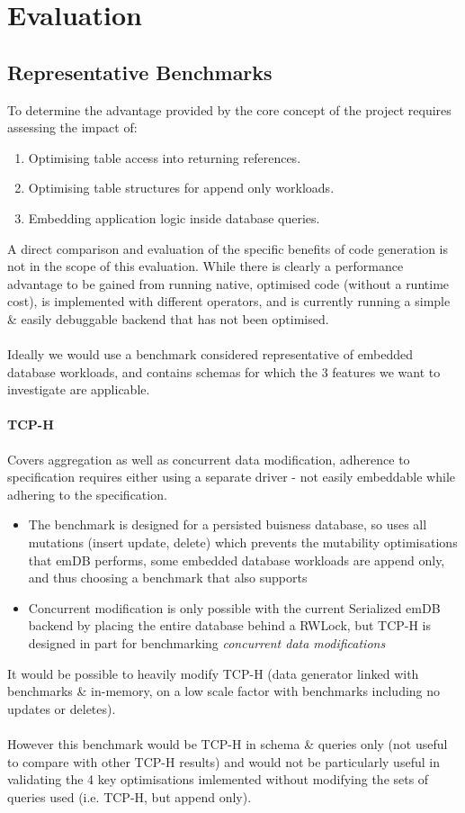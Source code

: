 \chapter{Evaluation}

\section{Representative Benchmarks}
To determine the advantage provided by the core concept of the project requires assessing the impact of:
\begin{enumerate}
    \setlength\itemsep{0em}
    \item Optimising table access into returning references.
    \item Optimising table structures for append only workloads.
    \item Embedding application logic inside database queries.
\end{enumerate}
A direct comparison and evaluation of the specific benefits of code generation is not in the scope of this evaluation.
While there is clearly a performance advantage to be gained from running native, optimised code (without a runtime cost), \emdb
is implemented with different operators, and is currently running a simple \& easily debuggable backend that has not been optimised.
\\
\\ Ideally we would use a benchmark considered representative of embedded database workloads,
and contains schemas for which the 3 features we want to investigate are applicable.
\subsubsection{TCP-H}
Covers aggregation as well as concurrent data modification, adherence to specification
requires either using a separate driver - not easily embeddable while adhering to the specification.
\begin{itemize}
    \setlength\itemsep{0em}
    \item The benchmark is designed for a persisted buisness database, so uses all mutations (insert update, delete)
          which prevents the mutability optimisations that emDB performs,
          some embedded database workloads are append only, and thus choosing a benchmark that also
          supports
    \item Concurrent modification is only possible with the current Serialized emDB backend by placing
          the entire database behind a RWLock, but TCP-H is designed in part for benchmarking \textit{concurrent data modifications}\cite{TCPHSpec}
\end{itemize}
It would be possible to heavily modify TCP-H (data generator linked with benchmarks \& in-memory, on a
low scale factor with benchmarks including no updates or deletes).
\\
\\ However this benchmark would be TCP-H in schema \& queries only (not useful to compare with other TCP-H results)
and would not be particularly useful in validating the 4 key optimisations imlemented without modifying
the sets of queries used (i.e. TCP-H, but append only).

